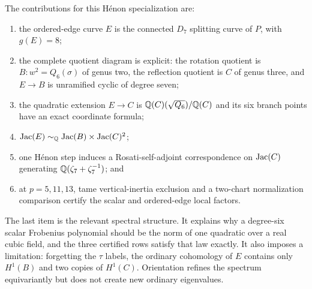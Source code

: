 The contributions for this H\'enon specialization are:
\begin{enumerate}
 \item the ordered-edge curve $E$ is the connected $D_7$ splitting curve of
 $P$, with $g(E)=8$;
 \item the complete quotient diagram is explicit: the rotation quotient is
 $B:w^2=Q_6(\sigma)$ of genus two, the reflection quotient is $C$ of genus
 three, and $E\to B$ is unramified cyclic of degree seven;
 \item the quadratic extension $E\to C$ is
 $\mathbb Q(C)(\sqrt{Q_6})/\mathbb Q(C)$ and its six branch points have an exact coordinate
 formula;
 \item $\operatorname{Jac}(E)\sim_\mathbb Q\operatorname{Jac}(B)\times\operatorname{Jac}(C)^2$;
 \item one H\'enon step induces a Rosati-self-adjoint correspondence on
 $\operatorname{Jac}(C)$ generating $\mathbb Q(\zeta_7+\zeta_7^{-1})$; and
 \item at $p=5,11,13$, tame vertical-inertia exclusion and a two-chart
 normalization comparison certify the scalar and ordered-edge local factors.
\end{enumerate}

The last item is the relevant spectral structure.  It explains why a
degree-six scalar Frobenius polynomial should be the norm of one quadratic
over a real cubic field, and the three certified rows satisfy that law
exactly.  It also imposes a limitation: forgetting the $\tau$ labels, the
ordinary cohomology of $E$ contains only $H^1(B)$ and two copies of
$H^1(C)$.  Orientation refines the spectrum equivariantly but does not create
new ordinary eigenvalues.
